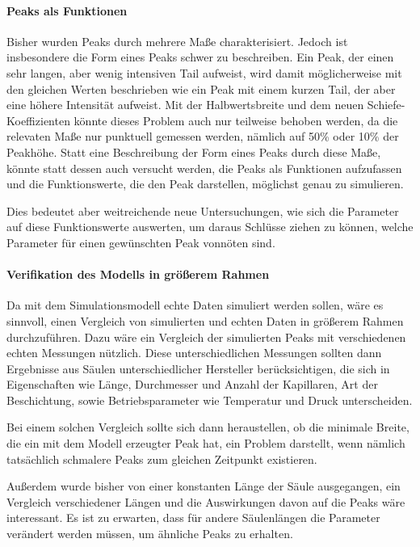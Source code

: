 \paragraph{Peaks als Funktionen}
Bisher wurden Peaks durch mehrere Maße charakterisiert. Jedoch ist insbesondere die Form eines Peaks schwer zu beschreiben. Ein Peak, der einen sehr langen, aber wenig intensiven Tail aufweist, wird damit möglicherweise mit den gleichen Werten beschrieben wie ein Peak mit einem kurzen Tail, der aber eine höhere Intensität aufweist. Mit der Halbwertsbreite und dem neuen Schiefe-Koeffizienten könnte dieses Problem auch nur teilweise behoben werden, da die relevaten Maße nur punktuell gemessen werden, nämlich auf 50\% oder 10\% der Peakhöhe. Statt eine Beschreibung der Form eines Peaks durch diese Maße, könnte statt dessen auch versucht werden, die Peaks als Funktionen aufzufassen und die Funktionswerte, die den Peak darstellen, möglichst genau zu simulieren. 

Dies bedeutet aber weitreichende neue Untersuchungen, wie sich die Parameter auf diese Funktionswerte auswerten, um daraus Schlüsse ziehen zu können, welche Parameter für einen gewünschten Peak vonnöten sind.



\paragraph{Verifikation des Modells in größerem Rahmen}
Da mit dem Simulationsmodell echte Daten simuliert werden sollen, wäre es sinnvoll, einen Vergleich von simulierten und echten Daten in größerem Rahmen durchzuführen. Dazu wäre ein Vergleich der simulierten Peaks mit verschiedenen echten Messungen nützlich. Diese unterschiedlichen Messungen sollten dann Ergebnisse aus Säulen unterschiedlicher Hersteller berücksichtigen, die sich in Eigenschaften wie Länge, Durchmesser und Anzahl der Kapillaren, Art der Beschichtung, sowie Betriebsparameter wie Temperatur und Druck unterscheiden. 

Bei einem solchen Vergleich sollte sich dann heraustellen, ob die minimale Breite, die ein mit dem Modell erzeugter Peak hat, ein Problem darstellt, wenn nämlich tatsächlich schmalere Peaks zum gleichen Zeitpunkt existieren. 

Außerdem wurde bisher von einer konstanten Länge der Säule ausgegangen, ein Vergleich verschiedener Längen und die Auswirkungen davon auf die Peaks wäre interessant. Es ist zu erwarten, dass für andere Säulenlängen die Parameter verändert werden müssen, um ähnliche Peaks zu erhalten.

